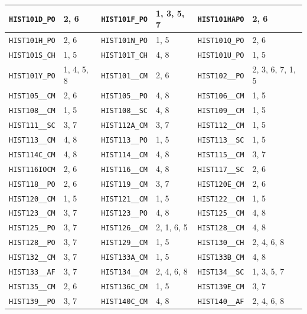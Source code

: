 \begin{longtable}{|l|l||l|l||l|l|}
    \verb|HIST101D_PO| & 2, 6 & \verb|HIST101F_PO| & 1, 3, 5, 7 & \verb|HIST101HAPO| & 2, 6\\\hline
    \verb|HIST101H_PO| & 2, 6 & \verb|HIST101N_PO| & 1, 5 & \verb|HIST101Q_PO| & 2, 6\\\hline
    \verb|HIST101S_CH| & 1, 5 & \verb|HIST101T_CH| & 4, 8 & \verb|HIST101U_PO| & 1, 5\\\hline
    \verb|HIST101Y_PO| & 1, 4, 5, 8 & \verb|HIST101__CM| & 2, 6 & \verb|HIST102__PO| & 2, 3, 6, 7, 1, 5\\\hline
    \verb|HIST105__CM| & 2, 6 & \verb|HIST105__PO| & 4, 8 & \verb|HIST106__CM| & 1, 5\\\hline
    \verb|HIST108__CM| & 1, 5 & \verb|HIST108__SC| & 4, 8 & \verb|HIST109__CM| & 1, 5\\\hline
    \verb|HIST111__SC| & 3, 7 & \verb|HIST112A_CM| & 3, 7 & \verb|HIST112__CM| & 1, 5\\\hline
    \verb|HIST113__CM| & 4, 8 & \verb|HIST113__PO| & 1, 5 & \verb|HIST113__SC| & 1, 5\\\hline
    \verb|HIST114C_CM| & 4, 8 & \verb|HIST114__CM| & 4, 8 & \verb|HIST115__CM| & 3, 7\\\hline
    \verb|HIST116IOCM| & 2, 6 & \verb|HIST116__CM| & 4, 8 & \verb|HIST117__SC| & 2, 6\\\hline
    \verb|HIST118__PO| & 2, 6 & \verb|HIST119__CM| & 3, 7 & \verb|HIST120E_CM| & 2, 6\\\hline
    \verb|HIST120__CM| & 1, 5 & \verb|HIST121__CM| & 1, 5 & \verb|HIST122__CM| & 1, 5\\\hline
    \verb|HIST123__CM| & 3, 7 & \verb|HIST123__PO| & 4, 8 & \verb|HIST125__CM| & 4, 8\\\hline
    \verb|HIST125__PO| & 3, 7 & \verb|HIST126__CM| & 2, 1, 6, 5 & \verb|HIST128__CM| & 4, 8\\\hline
    \verb|HIST128__PO| & 3, 7 & \verb|HIST129__CM| & 1, 5 & \verb|HIST130__CH| & 2, 4, 6, 8\\\hline
    \verb|HIST132__CM| & 3, 7 & \verb|HIST133A_CM| & 1, 5 & \verb|HIST133B_CM| & 4, 8\\\hline
    \verb|HIST133__AF| & 3, 7 & \verb|HIST134__CM| & 2, 4, 6, 8 & \verb|HIST134__SC| & 1, 3, 5, 7\\\hline
    \verb|HIST135__CM| & 2, 6 & \verb|HIST136C_CM| & 1, 5 & \verb|HIST139E_CM| & 3, 7\\\hline
    \verb|HIST139__PO| & 3, 7 & \verb|HIST140C_CM| & 4, 8 & \verb|HIST140__AF| & 2, 4, 6, 8\\\hline

\end{longtable}
